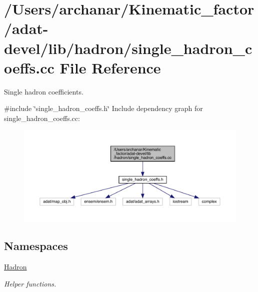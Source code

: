 \hypertarget{adat-devel_2lib_2hadron_2single__hadron__coeffs_8cc}{}\section{/\+Users/archanar/\+Kinematic\+\_\+factor/adat-\/devel/lib/hadron/single\+\_\+hadron\+\_\+coeffs.cc File Reference}
\label{adat-devel_2lib_2hadron_2single__hadron__coeffs_8cc}


Single hadron coefficients.  


{\ttfamily \#include \char`\"{}single\+\_\+hadron\+\_\+coeffs.\+h\char`\"{}}\newline
Include dependency graph for single\+\_\+hadron\+\_\+coeffs.\+cc\+:
\nopagebreak
\begin{figure}[H]
\begin{center}
\leavevmode
\includegraphics[width=350pt]{d2/d1e/adat-devel_2lib_2hadron_2single__hadron__coeffs_8cc__incl}
\end{center}
\end{figure}
\subsection*{Namespaces}
\begin{DoxyCompactItemize}
\item 
 \mbox{\hyperlink{namespaceHadron}{Hadron}}
\begin{DoxyCompactList}\small\item\em Helper functions. \end{DoxyCompactList}\end{DoxyCompactItemize}
